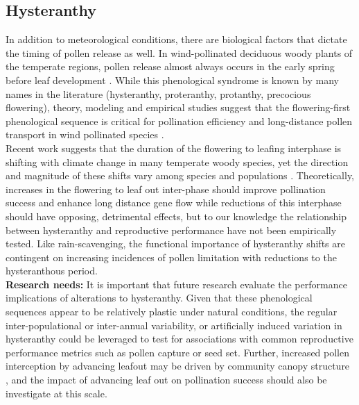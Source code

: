 \documentclass[11pt]{article}
\begin{document}
\subsection*{Hysteranthy}
\noindent In addition to meteorological conditions, there are biological factors that dictate the timing of pollen release as well. In wind-pollinated deciduous woody plants of the temperate regions, pollen release almost always occurs in the early spring before leaf development \citep{Whitehead1969}. While this phenological syndrome is known by many names in the literature (hysteranthy, proteranthy, protanthy, precocious flowering)\citep{Buonaiuto2020}, theory, modeling and empirical studies suggest that the flowering-first phenological sequence is critical for pollination efficiency and long-distance pollen transport in wind pollinated species \citep{Tauber1967,Nathan2005,Milleron2012}.\\

\noindent Recent work suggests that the duration of the flowering to leafing interphase is shifting with climate change in many temperate woody species, yet the direction and magnitude of these shifts vary among species and populations \citep{Buonaiuto2020,Buonaiuto2020b}. Theoretically, increases in the flowering to leaf out inter-phase should improve pollination success and enhance long distance gene flow while reductions of this interphase should have opposing, detrimental effects, but to our knowledge the relationship between hysteranthy and reproductive performance have not been empirically tested. Like rain-scavenging, the functional importance of hysteranthy shifts are contingent on increasing incidences of pollen limitation with reductions to the hysteranthous period. \\

\textbf{Research needs:} It is important that future research evaluate the performance implications of alterations to hysteranthy. Given that these phenological sequences appear to be relatively plastic under natural conditions, the regular inter-populational or inter-annual variability, or artificially induced variation in hysteranthy could be leveraged to test for associations with common reproductive performance metrics such as pollen capture or seed set. Further, increased pollen interception by advancing leafout may be driven by community canopy structure \citep{Khanduri:2019aa}, and the impact of advancing leaf out on pollination success should also be investigate at this scale.\\ 
\end{document}
